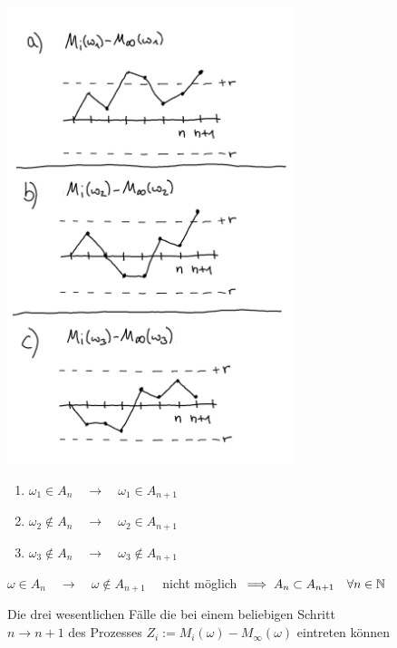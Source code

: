 \documentclass[12pt,a4paper]{article}
\begin{document}
	\begin{figure}
			\caption{Die drei wesentlichen Fälle die bei einem beliebigen Schritt $n\rightarrow n+1$ des Prozesses $Z_i:=M_i(\omega)-M_\infty(\omega)$ eintreten können}
			\includegraphics[width=0.75\textwidth]{pics/SketchUE1.png}
			\begin{enumerate}[label=Fall \alph{*})]
				\item \qquad $\omega_1 \in A_n \quad \rightarrow\quad \omega_1 \in A_{n+1}$
				\item \qquad $\omega_2 \not\in A_n \quad \rightarrow \quad \omega_2 \in A_{n+1}$
				\item \qquad $\omega_3 \not\in A_n \quad \rightarrow \quad \omega_3 \not\in A_{n+1}$
			\end{enumerate}
			$\omega \in A_n \quad \rightarrow \quad \omega \not\in A_{n+1} \quad$ nicht möglich $\implies A_n \subset A_{n+1} \quad\forall n\in\mathbb{N}$
			\label{AbbUEProzess}
	\end{figure}
\end{document}
